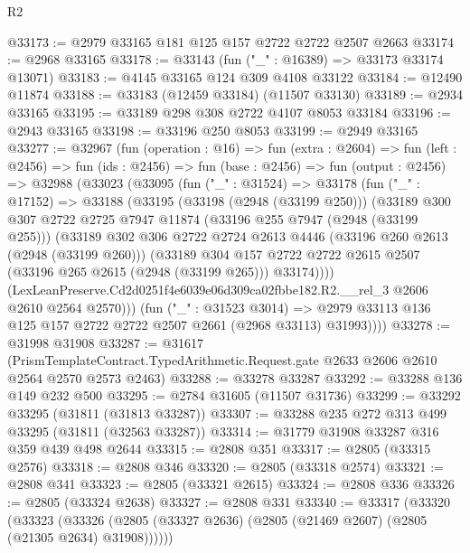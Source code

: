 \begin{lexlean}{R2}
\begin{coremodule}
@33173 := @2979 @33165 @181 @125 @157 @2722 @2722 @2507 @2663
@33174 := @2968 @33165
@33178 := @33143 (fun ("_" : @16389) => @33173 @33174 @13071)
@33183 := @4145 @33165 @124 @309 @4108 @33122
@33184 := @12490 @11874
@33188 := @33183 (@12459 @33184) (@11507 @33130)
@33189 := @2934 @33165
@33195 := @33189 @298 @308 @2722 @4107 @8053 @33184
@33196 := @2943 @33165
@33198 := @33196 @250 @8053
@33199 := @2949 @33165
@33277 := @32967
    (fun (operation : @16) =>
    fun (extra : @2604) =>
    fun (left : @2456) =>
    fun (ids : @2456) =>
    fun (base : @2456) =>
    fun (output : @2456) =>
    @32988
      (@33023
        (@33095
          (fun ("_" : @31524) =>
          @33178
            (fun ("_" : @17152) =>
            @33188
              (@33195
                (@33198 (@2948 (@33199 @250)))
                (@33189
                  @300
                  @307
                  @2722
                  @2725
                  @7947
                  @11874
                  (@33196 @255 @7947 (@2948 (@33199 @255)))
                  (@33189
                    @302
                    @306
                    @2722
                    @2724
                    @2613
                    @4446
                    (@33196 @260 @2613 (@2948 (@33199 @260)))
                    (@33189
                      @304
                      @157
                      @2722
                      @2722
                      @2615
                      @2507
                      (@33196 @265 @2615 (@2948 (@33199 @265)))
                      @33174))))
              (LexLeanPreserve.Cd2d0251f4e6039e06d309ca02fbbe182.R2.__rel_3
                @2606
                @2610
                @2564
                @2570)))
          (fun ("_" : @31523 @3014) =>
          @2979 @33113 @136 @125 @157 @2722 @2722 @2507 @2661 (@2968 @33113) @31993))))
@33278 := @31998 @31908
@33287 := @31617
    (PrismTemplateContract.TypedArithmetic.Request.gate @2633 @2606 @2610 @2564 @2570 @2573 @2463)
@33288 := @33278 @33287
@33292 := @33288 @136 @149 @232 @500
@33295 := @2784 @31605 (@11507 @31736)
@33299 := @33292 @33295 (@31811 (@31813 @33287))
@33307 := @33288 @235 @272 @313 @499 @33295 (@31811 (@32563 @33287))
@33314 := @31779 @31908 @33287 @316 @359 @439 @498 @2644
@33315 := @2808 @351
@33317 := @2805 (@33315 @2576)
@33318 := @2808 @346
@33320 := @2805 (@33318 @2574)
@33321 := @2808 @341
@33323 := @2805 (@33321 @2615)
@33324 := @2808 @336
@33326 := @2805 (@33324 @2638)
@33327 := @2808 @331
@33340 := @33317
    (@33320
      (@33323 (@33326 (@2805 (@33327 @2636) (@2805 (@21469 @2607) (@2805 (@21305 @2634) @31908))))))

\end{coremodule}
\end{lexlean}
